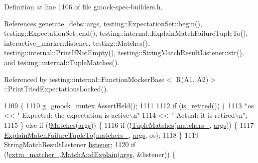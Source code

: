 Definition at line 1106 of file gmock-\/spec-\/builders.\+h.



References generate\+\_\+debs\+::args, testing\+::\+Expectation\+Set\+::begin(), testing\+::\+Expectation\+Set\+::end(), testing\+::internal\+::\+Explain\+Match\+Failure\+Tuple\+To(), interactive\+\_\+marker\+::listener, testing\+::\+Matches(), testing\+::internal\+::\+Print\+If\+Not\+Empty(), testing\+::\+String\+Match\+Result\+Listener\+::str(), and testing\+::internal\+::\+Tuple\+Matches().



Referenced by testing\+::internal\+::\+Function\+Mocker\+Base$<$ R(\+A1, A2)$>$\+::\+Print\+Tried\+Expectations\+Locked().


\begin{DoxyCode}
1109                                                         \{
1110     g\_gmock\_mutex.AssertHeld();
1111 
1112     \textcolor{keywordflow}{if} (\hyperlink{classtesting_1_1internal_1_1ExpectationBase_afe539dbc5b29d9635403767a4708c476}{is\_retired}()) \{
1113       *os << \textcolor{stringliteral}{"         Expected: the expectation is active\(\backslash\)n"}
1114           << \textcolor{stringliteral}{"           Actual: it is retired\(\backslash\)n"};
1115     \} \textcolor{keywordflow}{else} \textcolor{keywordflow}{if} (!\hyperlink{classtesting_1_1internal_1_1TypedExpectation_a010336f587859d990b718cd74f13e617}{Matches}(\hyperlink{namespacegenerate__debs_a75f9143e38df82d83b2e8a6f99cae02c}{args})) \{
1116       \textcolor{keywordflow}{if} (!\hyperlink{namespacetesting_1_1internal_a10095d1e1c99369200072b39d657ebc4}{TupleMatches}(\hyperlink{classtesting_1_1internal_1_1TypedExpectation_a40c442a0e8fffc8bf94611a8130998bf}{matchers\_}, \hyperlink{namespacegenerate__debs_a75f9143e38df82d83b2e8a6f99cae02c}{args})) \{
1117         \hyperlink{namespacetesting_1_1internal_afd62fd8914a7fae1bfc8a314fcc81f22}{ExplainMatchFailureTupleTo}(\hyperlink{classtesting_1_1internal_1_1TypedExpectation_a40c442a0e8fffc8bf94611a8130998bf}{matchers\_}, 
      \hyperlink{namespacegenerate__debs_a75f9143e38df82d83b2e8a6f99cae02c}{args}, os);
1118       \}
1119       StringMatchResultListener \hyperlink{namespaceinteractive__marker_a0e579ab555212bb5e2c9f8a675b7618a}{listener};
1120       \textcolor{keywordflow}{if} (!\hyperlink{classtesting_1_1internal_1_1TypedExpectation_a7d2fef3d4429a3a350282e6030a45ba4}{extra\_matcher\_}.\hyperlink{classtesting_1_1internal_1_1MatcherBase_a08429a6d7e7d330de4a4eb4e272105a7}{MatchAndExplain}(\hyperlink{namespacegenerate__debs_a75f9143e38df82d83b2e8a6f99cae02c}{args}, &listener)) \{

\end{DoxyCode}

